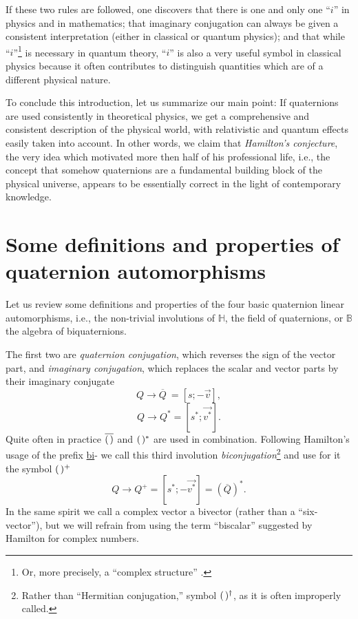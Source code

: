 \documentclass [12pt,a4paper      ]{article}
\newcommand{\bbH}{\mathbb{H}}         %
\newcommand{\bbB}{\mathbb{B}}         %
\newcommand{\CON}{\overline}          %
\newcommand{\A}{(\hspace{.5mm})} %
\newcommand{\ADJ}{\dagger}            %
\begin{document}
     If these two rules are followed, one discovers that there is 
one  and  only   one  ``$i$'' in physics  and  in  mathematics;  that 
imaginary   conjugation   can  always  be  given   a   consistent 
interpretation  (either  in classical or  quantum  physics);  and
that while ``$i$''\footnote{Or, more precisely, a ``complex structure'' \cite{R6}.} is necessary in quantum theory, ``$i$'' is also a 
very useful symbol in classical physics  because 
it often contributes to distinguish quantities which are of a different 
physical nature.

     To  conclude this introduction,  let us summarize  our  main 
point:   If  quaternions are  used  consistently  in  theoretical 
physics, we get a comprehensive and consistent description of the 
physical  world,  with  relativistic and quantum  effects  easily 
taken  into account.   In other words,  we claim that \emph{Hamilton's 
conjecture},  the  very idea which motivated more then half of his 
professional life, i.e., the concept that somehow quaternions are 
a fundamental building block of the physical universe, appears to 
be  essentially correct in the light of contemporary knowledge.


\section{Some definitions and properties of\\ quaternion automorphisms}
\label{def:0}

     Let  us  review some definitions and properties of the  four 
basic  quaternion  linear  automorphisms,  i.e.,  the  non-trivial 
involutions of $\bbH$,  the field of quaternions,  or $\bbB$ the algebra of biquaternions.

     The first two are \emph{quaternion conjugation}, which reverses the 
sign  of  the  vector  part,  and \emph{imaginary  conjugation},  which 
replaces   the  scalar  and  vector  parts  by  their   imaginary 
conjugate
%
\begin{equation}\label{E4}
        Q \rightarrow \CON{Q}~  = [ s;  -\vec{v}], %
\end{equation}
%
\begin{equation}\label{E5}
             Q \rightarrow Q^* = [ s^*; \vec{v^*}].    %
\end{equation}
%
Quite  often  in practice $\CON{\A}$ and $\A^*$ are used in  combination. 
Following  Hamilton's  usage of the prefix \underline{bi}- we  call  this 
third involution \emph{biconjugation}\footnote{Rather than ``Hermitian conjugation,'' symbol $\A^\ADJ$, as it is often improperly called.} 
and use for it the symbol $\A^+$ 
%
\begin{equation}\label{E6}
        Q \rightarrow Q^+  = [ s^*; -\vec{v^*}] = (\CON{Q})^*.  %
\end{equation}
%
In the same spirit we call a complex vector a  bivector  (rather than a 
``six-vector''),  but  we will refrain from using the term ``biscalar'' 
suggested by Hamilton for complex numbers.
\end{document}
